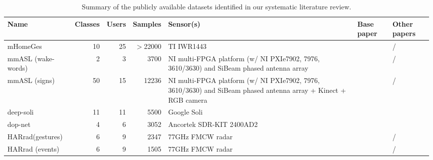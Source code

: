 \begin{table}[hbt]
    \centering
    \footnotesize
    \begin{tabular}{>{\raggedright}p{1.8cm}rrr>{\raggedright}p{2.6cm}>{\raggedright}p{0.8cm}>{\raggedright\arraybackslash}p{0.9cm}}
        \toprule
        \textbf{Name} & \textbf{Classes} & \textbf{Users} & \textbf{Samples} & \textbf{Sensor(s)} & \textbf{Base paper} & \textbf{Other papers} \\
        \midrule
        mHomeGes & 10 & 25 & $>$22000 & TI IWR1443 & \cite{Liu:2020b} & /  \\
        \addlinespace[2pt]
        mmASL (wake-words) & 2 & 3 & 3700 & NI multi-FPGA platform (w/ NI PXIe7902, 7976, 3610/3630) and SiBeam phased antenna array & \cite{Santhalingam:2020b} & /  \\
        \addlinespace[2pt]
        mmASL (signs) & 50 & 15 & 12236 & NI multi-FPGA platform (w/ NI PXIe7902, 7976, 3610/3630) and SiBeam phased antenna array + Kinect + RGB camera  & \cite{Santhalingam:2020b} & /  \\
        \addlinespace[2pt]
        deep-soli & 11 & 11 & 5500 & Google Soli & \cite{Wang:2016} & \cite{Berenguer:2019}  \\
        \addlinespace[2pt]
        dop-net & 4 & 6 & 3052 & Ancortek SDR-KIT 2400AD2 & \cite{Ritchie:2020} & \cite{Bannon:2020}  \\
        \addlinespace[2pt]
        HARrad\newline(gestures) & 6 & 9 & 2347 & 77GHz FMCW radar & \cite{Vandersmissen:2020} & /  \\
        \addlinespace[2pt]
        HARrad (events) & 6 & 9 & 1505 & 77GHz FMCW radar & \cite{Vandersmissen:2020} & /  \\
        \bottomrule
    \end{tabular}
    \caption{Summary of the publicly available datasets identified in our systematic literature review.}
    \label{tab:state_of_the_art:radar-slr-datasets}
\end{table}


